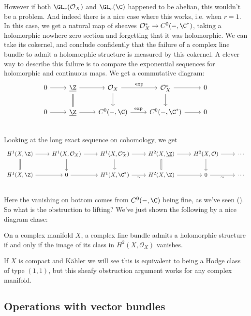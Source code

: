 \documentclass[11pt]{book}
\begin{document}
However if both $\GL_r(\mathcal{O}_X)$ and $\GL_r(\C)$ happened to be abelian, this wouldn't be a problem. And indeed there is a nice case where this works, i.e. when $r=1$. In this case, we get a natural map of sheaves $\mathcal{O}_X^\ast \to C^0(-,\C^\ast)$, taking a holomorphic nowhere zero section and forgetting that it was holomorphic. We can take its cokernel, and conclude confidently that the failure of a complex line bundle to admit a holomorphic structure is measured by this cokernel. A clever way to describe this failure is to compare the exponential sequences for holomorphic and continuous maps. We get a commutative diagram:
\[ \begin{tikzcd}
    0\rar & \underline{\Z}\rar\dar[equal] & \mathcal{O}_X\rar["\exp"]\dar & \mathcal{O}_X^\ast\dar\rar & 0\\
    0\rar & \underline{\Z}\rar & {C^0(-,\C)}\rar["\exp"] & {C^0(-,\C^\ast)}\rar & 0\\
\end{tikzcd} \]
Looking at the long exact sequence on cohomology, we get
\[ \begin{tikzcd}
    {H^1(X,\Z)}\rar\dar[equal] & {H^1(X,\mathcal{O}_X)}\rar\dar & {H^1(X,\mathcal{O}_X^\ast)}\rar\dar & {H^2(X,\underline{\Z})}\rar\dar[equal] & {H^2(X,\mathcal{O})}\rar\dar & \cdots\\
    {H^1(X,\Z)}\rar & 0\rar & {H^1(X,\C^\ast)}\rar["\sim" below] & {H^2(X,\Z)}\rar & 0\rar["\sim" below] & \cdots\\
\end{tikzcd} \]
Here the vanishing on bottom comes from $C^0(-,\C)$ being fine, as we've seen (). So what is the obstruction to lifting? We've just shown the following by a nice diagram chase:

\begin{proposition} On a complex manifold $X$, a complex line bundle admits a holomorphic structure if and only if the image of its class in $H^2(X,\mathcal{O}_X)$ vanishes.
\end{proposition}

If $X$ is compact and K\"{a}hler we will see this is equivalent to being a Hodge class of type $(1,1)$, but this sheafy obstruction argument works for any complex manifold.

\subsection{Operations with vector bundles}
\end{document}
